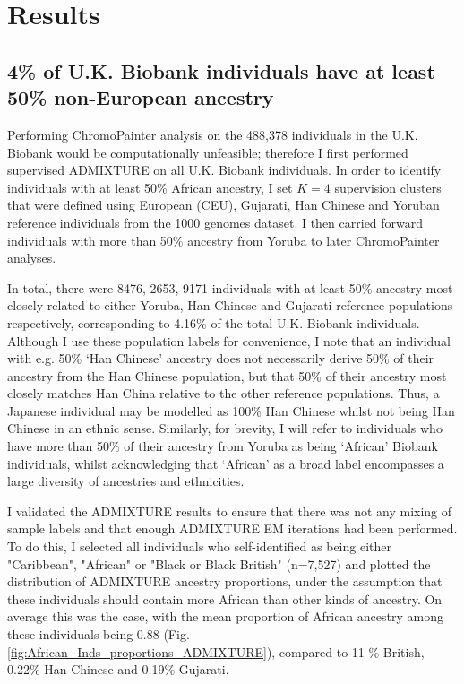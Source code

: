 \section{Results}

\subsection{4\% of U.K. Biobank individuals have at least 50\% non-European ancestry}

Performing ChromoPainter analysis on the 488,378 individuals in the U.K. Biobank would be computationally unfeasible; therefore I first performed supervised ADMIXTURE on all U.K. Biobank individuals. In order to identify individuals with at least 50\% African ancestry, I set $K=4$ supervision clusters that were defined using European (CEU), Gujarati, Han Chinese and Yoruban reference individuals from the 1000 genomes dataset. I then carried forward individuals with more than 50\% ancestry from Yoruba to later ChromoPainter analyses.

In total, there were 8476, 2653, 9171 individuals with at least 50\% ancestry most closely related to either Yoruba, Han Chinese and Gujarati reference populations respectively, corresponding to 4.16\% of the total U.K. Biobank individuals. Although I use these population labels for convenience, I note that an individual with e.g. 50\% `Han Chinese' ancestry does not necessarily derive 50\% of their ancestry from the Han Chinese population, but that 50\% of their ancestry most closely matches Han China relative to the other reference populations. Thus, a Japanese individual may be modelled as 100\% Han Chinese whilst not being Han Chinese in an ethnic sense. Similarly, for brevity, I will refer to individuals who have more than 50\% of their ancestry from Yoruba as being `African' Biobank individuals, whilst acknowledging that `African' as a broad label encompasses a large diversity of ancestries and ethnicities.  

I validated the ADMIXTURE results to ensure that there was not any mixing of sample labels and that enough ADMIXTURE EM iterations had been performed. To do this, I selected all individuals who self-identified as being either "Caribbean", "African" or "Black or Black British" (n=7,527) and plotted the distribution of ADMIXTURE ancestry proportions, under the assumption that these individuals should contain more African than other kinds of ancestry. On average this was the case, with the mean proportion of African ancestry among these individuals being 0.88 (Fig. \ref{fig:African_Inds_proportions_ADMIXTURE}), compared to 11 \% British, 0.22\% Han Chinese and 0.19\% Gujarati.

